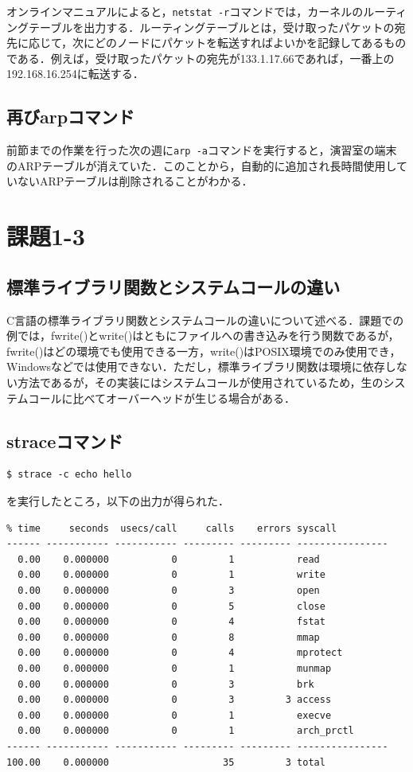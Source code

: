 \documentclass[a4j,10pt,titlepage]{jsarticle}
\begin{document}
オンラインマニュアルによると，\verb|netstat -r|コマンドでは，カーネルのルーティングテーブルを出力する．ルーティングテーブルとは，受け取ったパケットの宛先に応じて，次にどのノードにパケットを転送すればよいかを記録してあるものである．例えば，受け取ったパケットの宛先が133.1.17.66であれば，一番上の192.168.16.254に転送する．

\subsection{再びarpコマンド}
前節までの作業を行った次の週に\verb|arp -a|コマンドを実行すると，演習室の端末のARPテーブルが消えていた．このことから，自動的に追加され長時間使用していないARPテーブルは削除されることがわかる．

\section{課題1-3}
\subsection{標準ライブラリ関数とシステムコールの違い}
C言語の標準ライブラリ関数とシステムコールの違いについて述べる．課題での例では，fwrite()とwrite()はともにファイルへの書き込みを行う関数であるが，fwrite()はどの環境でも使用できる一方，write()はPOSIX環境でのみ使用でき，Windowsなどでは使用できない．ただし，標準ライブラリ関数は環境に依存しない方法であるが，その実装にはシステムコールが使用されているため，生のシステムコールに比べてオーバーヘッドが生じる場合がある．

\subsection{straceコマンド}
\begin{verbatim}
$ strace -c echo hello
\end{verbatim}
を実行したところ，以下の出力が得られた．

\begin{verbatim}
% time     seconds  usecs/call     calls    errors syscall
------ ----------- ----------- --------- --------- ----------------
  0.00    0.000000           0         1           read
  0.00    0.000000           0         1           write
  0.00    0.000000           0         3           open
  0.00    0.000000           0         5           close
  0.00    0.000000           0         4           fstat
  0.00    0.000000           0         8           mmap
  0.00    0.000000           0         4           mprotect
  0.00    0.000000           0         1           munmap
  0.00    0.000000           0         3           brk
  0.00    0.000000           0         3         3 access
  0.00    0.000000           0         1           execve
  0.00    0.000000           0         1           arch_prctl
------ ----------- ----------- --------- --------- ----------------
100.00    0.000000                    35         3 total
\end{verbatim}
\end{document}

